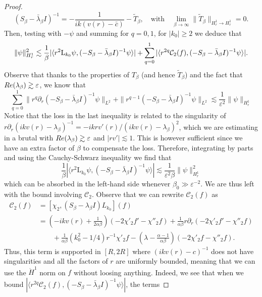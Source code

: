 \documentclass[11pt,reqno]{amsproc}
\def\eps{\varepsilon}
\def\de{{\partial}}
\def\Re{{\rm Re}}
\newcommand{\rmL}{\mathrm{L}}
\theoremstyle{definition}
\theoremstyle{definition}
\numberwithin{equation}{section}
\begin{document}
\begin{proof}
\begin{equation}
    (S_\beta-\bar{\lambda}_\beta I)^{-1}=-\frac{1}{ik(v(r)-\bar c)}-\tilde T_\beta, \quad \text{with}\quad 
\lim_{\beta \rightarrow \infty} \|\tilde T_{\beta} \|_{H^1_r \to H^1_r} = 0.
\end{equation}
Then, testing with $-\psi$ and summing for $q=0,1$,  for $|k_0|\geq 2$ we deduce that
\begin{align}
\notag
\|\psi\|^2_{H^1_r}
   \lesssim  \frac{1}{\beta}|\langle r^{2}\rmL_{k_0}\psi, (-S_\beta-\bar{\lambda}_\beta I)^{-1} \psi \rangle | 
+\sum_{q=0}^1|\langle r^{2q}\mathcal{C}_2(f), (-S_\beta-\bar{\lambda}_\beta I)^{-1} \psi \rangle|.
\end{align}
Observe that thanks to the properties of $T_\beta$ (and hence $\tilde{T}_\beta$) and the fact that $\Re(\lambda_\beta)\gtrsim \eps$, we know that 
\begin{equation}
   \sum_{q=0}^1 \|r^q\de_r(-S_\beta-\bar{\lambda}_\beta I)^{-1} \psi\|_{L^2}+\|r^{q-1}(-S_\beta-\bar{\lambda}_\beta I)^{-1} \psi\|_{L^2}\lesssim \frac{1}{\eps^2}\|\psi\|_{H^1_r}
\end{equation}
Notice that the loss in the last inequality is related to the singularity of $r\de_r(ikv(r)-\lambda_\beta)^{-1}=-ikrv'(r)/(ikv(r)-\lambda_\beta)^2$, which we are estimating in a brutal with $\Re(\lambda_\beta)\gtrsim \eps$ and $|rv'|\lesssim 1$. This is however sufficient since we have an extra factor of $\beta$ to compensate the loss. 
Therefore,  integrating by parts  and using the Cauchy-Schwarz inequality we find that 
\begin{equation}
   \frac{1}{\beta} |\langle r^{2}\rmL_{k_0}\psi, (-S_\beta-\bar{\lambda}_\beta I)^{-1} \psi \rangle |\lesssim \frac{1}{\eps^2\beta}\|\psi\|_{H^1_r}^2
\end{equation}
which can be absorbed in the left-hand side whenever $\beta_0\gg \eps^{-2}$. We are thus left with the bound involving $\mathcal{C}_2$. Observe that we can rewrite $\mathcal C_2(f)$ as
\begin{align}
\label{eq:c2rewritten}
\mathcal{C}_2(f) & =  [\chi_2, (S_\beta - \lambda_\beta I)L_{k_0}](f) \\ & = \left(-ikv(r) + \frac{1}{2\alpha \beta}\right) (-2\chi'_2 f' - \chi''_2 f) + \frac{1}{\alpha \beta} r\de_r (-2\chi'_2 f' - \chi''_2 f) \\ & \qquad + \frac{1}{\alpha \beta} (k_0^2 -1/4) r^{-1} \chi'_2 f - \left(\lambda - \frac{\alpha -1}{\alpha\beta}\right) (-2\chi'_2 f - \chi''_2 f).
\end{align}
Thus, this term is supported in $[R,2R]$ where $(ikv(r)-c)^{-1}$ does not have singularities and all the factors of $r$ are uniformly bounded, meaning that we can use the $\dot{H}^1$ norm on $f$ without loosing anything. Indeed, we see that when we bound $|\langle r^{2q}\mathcal{C}_2(f), (-S_\beta-\bar\lambda_\beta I)^{-1} \psi \rangle|$, the terms 

\end{proof}
\end{document}
